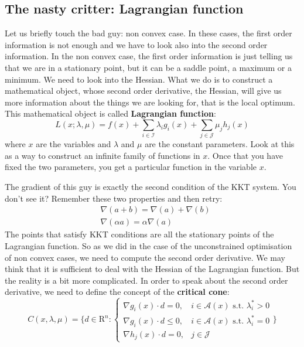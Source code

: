 \subsection{The nasty critter: Lagrangian function}
\par Let us briefly touch the bad guy: non convex case. In these cases, the first order information is not enough and we have to look also into the second order information. In the non convex case, the first order information is just telling us that we are in a stationary point, but it can be a saddle point, a maximum or a minimum. We need to look into the Hessian. What we do is to construct a mathematical object, whose second order derivative, the Hessian, will give us more information about the things we are looking for, that is the local optimum. This mathematical object is called \textbf{Lagrangian function}:
\begin{equation}
    L(x; \lambda, \mu) = f(x) + \sum_{i \in \mathcal{I}} \lambda_i g_i(x) + \sum_{j \in \mathcal{J}} \mu_j h_j(x)
    \label{eq:lagrangian_function}
\end{equation}
where $x$ are the variables and $\lambda$ and $\mu$ are the constant parameters. Look at this as a way to construct an infinite family of functions in $x$. Once that you have fixed the two parameters, you get a particular function in the variable $x$.
\par The gradient of this guy is exactly the second condition of the KKT system. You don't see it? Remember these two properties and then retry:
\begin{align}
    &\nabla(a + b) = \nabla(a) + \nabla(b)\\
    &\nabla(\alpha a) = \alpha \nabla(a)
\end{align}
The points that satisfy KKT conditions are all the stationary points of the Lagrangian function. So as we did in the case of the unconstrained optimisation of non convex cases, we need to compute the second order derivative. We may think that it is sufficient to deal with the Hessian of the Lagrangian function. But the reality is a bit more complicated. In order to speak about the second order derivative, we need to define the concept of the \textbf{critical cone}:
\begin{equation}
  C(x,\lambda,\mu)=
  \Bigg\{
    d \in \mathrm{R}^n : 
    \begin{cases}
        \nabla g_i(x) \cdot d = 0, & i \in \mathcal{A}(x) \mbox{ s.t. } \lambda_i^* > 0\\
        \nabla g_i(x) \cdot d \leq 0, & i \in \mathcal{A}(x) \mbox{ s.t. } \lambda_i^* = 0\\
        \nabla h_j(x) \cdot d = 0, & j \in \mathcal{J}
    \end{cases}
  \Bigg\}
\end{equation}
